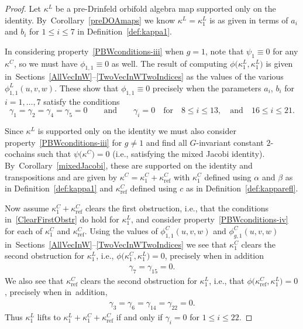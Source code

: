 \documentclass[10pt,a4paper]{amsart}
\numberwithin{equation}{section}
\DeclareMathOperator{\refl}{ref}
\begin{document}
\begin{proof}
Let $\kappa^L$ be a pre-Drinfeld orbifold algebra map supported only on the
identity. By~Corollary~\ref{preDOAmaps} we know $\kappa^L=\kappa^L_1$ is as given
in terms of $a_i$ and $b_i$ for $1 \leq i \leq 7$ in Definition~\ref{def:kappa1}.

In considering property~\eqref{PBWconditions-iii} when $g=1$, note that
$\psi_1 \equiv 0$ for any $\kappa^C$, so we must have $\phi_{1,1}\equiv 0$ as well.
The result of computing $\phi\big(\kappa^L_1,\kappa^L_1\big)$ is given
in~Sections~\ref{AllVecInW}--\ref{TwoVecInWTwoIndices} as the
values of the various $\phi^L_{1,1}(u,v,w)$.
These show that $\phi_{1,1}\equiv 0$
precisely when the parameters $a_i$, $b_i$ for $i=1,\dots,7$
satisfy the conditions
\begin{equation}
\label{ClearFirstObstr}
\gamma_1=\gamma_2=\gamma_4=\gamma_5=0\qquad \text{and}\qquad
\gamma_i=0 \quad \text{for}\quad 8\leq i \leq 13,\quad \text{and}\quad 16\leq i \leq 21.
\end{equation}

Since $\kappa^L$ is supported only on the identity we must also consider
property~\eqref{PBWconditions-iii} for $g \neq 1$ and find all
$G$-invariant constant $2$-cochains such that $\psi\big(\kappa^C\big)=0$
(i.e., satisfying the mixed Jacobi identity). By~Corollary~\ref{mixedJacobi}, these are
supported on the identity and transpositions and are given by
$\kappa^C=\kappa^C_1+\kappa^C_{\refl}$ with $\kappa^C_1$ defined using $\alpha$
and $\beta$ as in Definition~\ref{def:kappa1} and $\kappa^C_{\refl}$
defined using $c$ as in Definition~\ref{def:kapparefl}.

Now assume $\kappa^C_1+\kappa^C_{\refl}$ clears the first obstruction, i.e.,
that the conditions in~\eqref{ClearFirstObstr} do hold for $\kappa^L_1$, and
consider property~\eqref{PBWconditions-iv} for each of $\kappa^C_1$
and $\kappa^C_{\refl}$. Using the values of $\phi^C_{1,1}(u,v,w)$ and $\phi^C_{g,1}(u,v,w)$ in~Sections~\ref{AllVecInW}--\ref{TwoVecInWTwoIndices} we see that
$\kappa^C_1$ clears the second obstruction for $\kappa^L_1$,
i.e., $\phi\big(\kappa^C_1,\kappa^L_1\big)=0$,
precisely when in addition
\begin{gather}\label{ClearSecondObstr1C}
\gamma_7=\gamma_{15}=0.
\end{gather}
We also see that $\kappa^C_{\refl}$ clears the second obstruction for $\kappa^L_1$,
i.e., that $\phi\big(\kappa^C_{\refl},\kappa^L_1\big)=0$,
precisely when in~addition,
\begin{gather}
\label{ClearSecondObstr1Ref}
\gamma_3=\gamma_6=\gamma_{14}=\gamma_{22}=0.
\end{gather}
Thus $\kappa^L_1$ lifts to $\kappa^L_1+\kappa^C_1+\kappa^C_{\refl}$ if and
only if $\gamma_i=0$ for $1 \leq i \leq 22$.
\end{proof}
\end{document}
